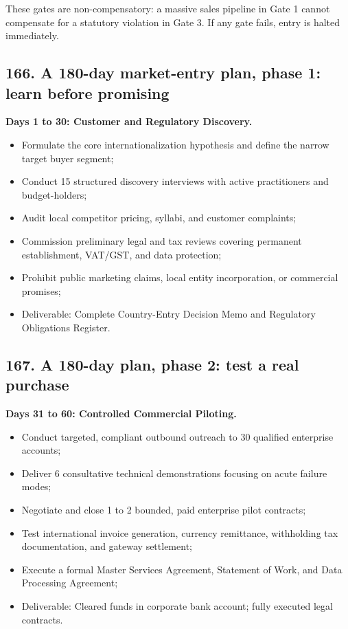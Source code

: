 These gates are non-compensatory: a massive sales pipeline in Gate 1 cannot compensate for a statutory violation in Gate 3. If any gate fails, entry is halted immediately.

\subsection{166. A 180-day market-entry plan, phase 1: learn before promising}

\textbf{Days 1 to 30: Customer and Regulatory Discovery.}
\begin{itemize}
    \item Formulate the core internationalization hypothesis and define the narrow target buyer segment;
    \item Conduct 15 structured discovery interviews with active practitioners and budget-holders;
    \item Audit local competitor pricing, syllabi, and customer complaints;
    \item Commission preliminary legal and tax reviews covering permanent establishment, VAT/GST, and data protection;
    \item Prohibit public marketing claims, local entity incorporation, or commercial promises;
    \item Deliverable: Complete Country-Entry Decision Memo and Regulatory Obligations Register.
\end{itemize}

\subsection{167. A 180-day plan, phase 2: test a real purchase}

\textbf{Days 31 to 60: Controlled Commercial Piloting.}
\begin{itemize}
    \item Conduct targeted, compliant outbound outreach to 30 qualified enterprise accounts;
    \item Deliver 6 consultative technical demonstrations focusing on acute failure modes;
    \item Negotiate and close 1 to 2 bounded, paid enterprise pilot contracts;
    \item Test international invoice generation, currency remittance, withholding tax documentation, and gateway settlement;
    \item Execute a formal Master Services Agreement, Statement of Work, and Data Processing Agreement;
    \item Deliverable: Cleared funds in corporate bank account; fully executed legal contracts.
\end{itemize}

